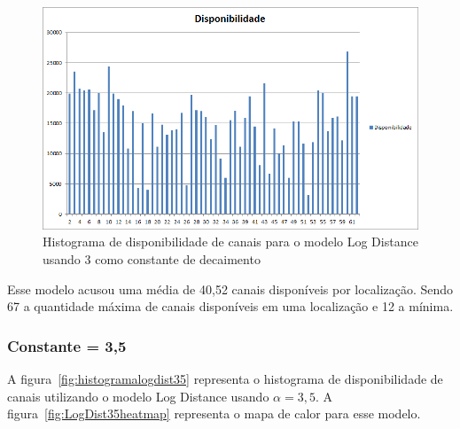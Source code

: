 \begin{figure}[htb]
\centering
\includegraphics[width=1.0\textwidth]{figs/histogramalogdist3}
\caption[Histograma de disponibilidade de canais para o modelo Log Distance usando 3 como constante de decaimento]
{Histograma de disponibilidade de canais para o modelo Log Distance usando 3 como constante de decaimento}
\label{fig:histogramalogdist3}
\end{figure} 

\FloatBarrier

Esse modelo acusou uma média de 40,52 canais disponíveis por localização. Sendo 67 a quantidade máxima de canais disponíveis em uma localização e 12 a mínima.

\subsubsection{Constante = 3,5}

A figura~\ref{fig:histogramalogdist35} representa o histograma de disponibilidade de canais utilizando o modelo Log Distance usando \begin{math}\alpha=3,5 \end{math}. A figura~\ref{fig:LogDist35heatmap} representa o mapa de calor para esse modelo.

